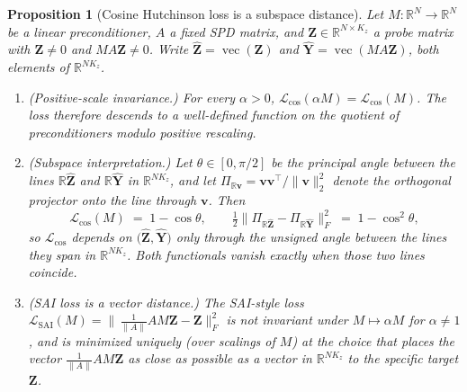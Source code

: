 \documentclass[acmtog]{acmart}
\theoremstyle{plain}
\newtheorem{proposition}{Proposition}
\begin{document}
\begin{proposition}[Cosine Hutchinson loss is a subspace distance]
\label{prop:cos-subspace}
Let $M:\mathbb{R}^N\!\to\!\mathbb{R}^N$ be a linear preconditioner, $A$ a fixed SPD matrix,
and $\mathbf{Z}\in\mathbb{R}^{N\times K_z}$ a probe matrix with
$\mathbf{Z}\!\ne\!0$ and $MA\mathbf{Z}\!\ne\!0$. Write
$\widehat{\mathbf{Z}}\!=\!\operatorname{vec}(\mathbf{Z})$ and
$\widehat{\mathbf{Y}}\!=\!\operatorname{vec}(MA\mathbf{Z})$, both elements of
$\mathbb{R}^{NK_z}$.
\begin{enumerate}
\item \emph{(Positive-scale invariance.)} For every $\alpha\!>\!0$,
$\mathcal{L}_{\cos}(\alpha M)\!=\!\mathcal{L}_{\cos}(M)$. The loss therefore descends to a
well-defined function on the quotient of preconditioners modulo positive rescaling.
\item \emph{(Subspace interpretation.)} Let $\theta\in[0,\pi/2]$ be the principal angle
between the lines $\mathbb{R}\widehat{\mathbf{Z}}$ and $\mathbb{R}\widehat{\mathbf{Y}}$ in
$\mathbb{R}^{NK_z}$, and let
$\Pi_{\mathbb{R}\mathbf{v}}\!=\!\mathbf{v}\mathbf{v}^\top\!/\|\mathbf{v}\|_2^2$ denote the
orthogonal projector onto the line through $\mathbf{v}$. Then
\begin{equation}
  \mathcal{L}_{\cos}(M) \;=\; 1-\cos\theta,
  \qquad
  \tfrac{1}{2}\bigl\|\Pi_{\mathbb{R}\widehat{\mathbf{Z}}}
              -\Pi_{\mathbb{R}\widehat{\mathbf{Y}}}\bigr\|_F^2
  \;=\; 1-\cos^2\theta,
  \label{eq:cos-proj}
\end{equation}
so $\mathcal{L}_{\cos}$ depends on $\bigl(\widehat{\mathbf{Z}},\widehat{\mathbf{Y}}\bigr)$
only through the unsigned angle between the lines they span in $\mathbb{R}^{NK_z}$. Both
functionals vanish exactly when those two lines coincide.
\item \emph{(SAI loss is a vector distance.)} The SAI-style loss
$\mathcal{L}_{\mathrm{SAI}}(M)\!=\!\bigl\|\,\tfrac{1}{\|A\|}AM\mathbf{Z}-\mathbf{Z}\bigr\|_F^2$
is \emph{not} invariant under $M\!\mapsto\!\alpha M$ for $\alpha\!\ne\!1$, and is minimized
uniquely (over scalings of $M$) at the choice that places the vector
$\tfrac{1}{\|A\|}AM\mathbf{Z}$ as close as possible \emph{as a vector in $\mathbb{R}^{NK_z}$}
to the specific target $\mathbf{Z}$.
\end{enumerate}
\end{proposition}
\end{document}
